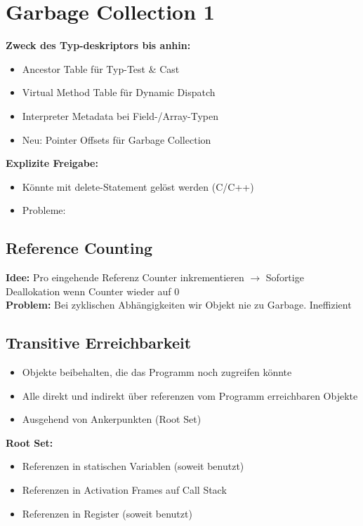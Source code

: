 
\section{Garbage Collection 1}
\textbf{Zweck des Typ-deskriptors bis anhin:}
\begin{itemize}[topsep=0pt]
    \itemsep -0.2em
    \item Ancestor Table für Typ-Test \& Cast
    \item Virtual Method Table für Dynamic Dispatch
    \item Interpreter Metadata bei Field-/Array-Typen
    \item Neu: Pointer Offsets für Garbage Collection
\end{itemize}
\textbf{Explizite Freigabe:}
\begin{itemize}[topsep=0pt]
    \itemsep -0.2em
    \item Könnte mit delete-Statement gelöst werden (C/C++)
    \item Probleme:
\end{itemize}

\subsection{Reference Counting}
\textbf{Idee:} Pro eingehende Referenz Counter inkrementieren $\rightarrow$ Sofortige Deallokation wenn Counter wieder auf 0\\
\textbf{Problem:} Bei zyklischen Abhängigkeiten wir Objekt nie zu Garbage. Ineffizient

\subsection{Transitive Erreichbarkeit}
\begin{itemize}[topsep=0pt]
    \itemsep -0.2em
    \item Objekte beibehalten, die das Programm noch zugreifen könnte
    \item Alle direkt und indirekt über referenzen vom Programm erreichbaren Objekte
    \item Ausgehend von Ankerpunkten (Root Set)
\end{itemize}
\textbf{Root Set:}
\begin{itemize}[topsep=0pt]
    \itemsep -0.2em
    \item Referenzen in statischen Variablen (soweit benutzt)
    \item Referenzen in Activation Frames auf Call Stack
    \item Referenzen in Register (soweit benutzt)
\end{itemize}

